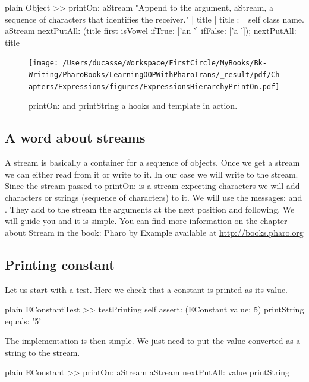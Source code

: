 \documentclass[10pt,twoside,english]{_support/latex/sbabook/sbabook}
\begin{document}
\begin{displaycode}{plain}
Object >> printOn: aStream
	"Append to the argument, aStream, a sequence of characters that  
	identifies the receiver."
	| title |
	title := self class name.
	aStream
		nextPutAll: (title first isVowel ifTrue: ['an '] ifFalse: ['a ']);
		nextPutAll: title
\end{displaycode}


\begin{figure}

\begin{center}
\texttt{[image: /Users/ducasse/Workspace/FirstCircle/MyBooks/Bk-Writing/PharoBooks/LearningOOPWithPharoTrans/\_result/pdf/Chapters/Expressions/figures/ExpressionsHierarchyPrintOn.pdf]}\caption{printOn: and printString a hooks and template in action.\label{fig:ExpressionsHierarchyPrintOn}}\end{center}
\end{figure}

\subsection{A word about streams}
A stream is basically a container for a sequence of objects. Once we get a stream we can either read from it or write to it. In our case we will write to the stream. Since the stream passed to printOn: is a stream expecting characters we will add characters or strings (sequence of characters) to it. We will use the messages:  and . 
They add to the stream the arguments at the next position and following. We will guide you and it is simple. 
You can find more information on the chapter about Stream in the book: Pharo by Example available at \url{http://books.pharo.org}
\subsection{Printing constant}
Let us start with a test. Here we check that a constant is printed as its value.

\begin{displaycode}{plain}
EConstantTest >> testPrinting
	self assert: (EConstant value: 5) printString equals: '5'
\end{displaycode}

The implementation is then simple. We just need to put the value converted as a string to the stream.
 

\begin{displaycode}{plain}
EConstant >> printOn: aStream
	aStream nextPutAll: value printString
\end{displaycode}
\end{document}
